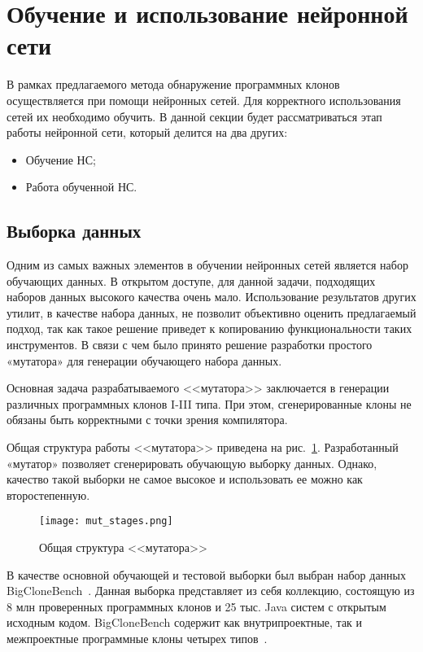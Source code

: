 \section{Обучение и использование нейронной сети}

В рамках предлагаемого метода обнаружение программных клонов осуществляется при помощи нейронных сетей. Для корректного использования сетей их необходимо обучить. В данной секции будет рассматриваться этап работы нейронной сети, который делится на два других:

\begin{itemize}
\setlength\itemsep{0mm}
\item Обучение НС;
\item Работа обученной НС.
\end{itemize}

\subsection{Выборка данных}

Одним из самых важных элементов в обучении нейронных сетей является набор обучающих данных. В открытом доступе, для данной задачи, подходящих наборов данных высокого качества очень мало. Использование результатов других утилит, в качестве набора данных, не позволит объективно оценить предлагаемый подход, так как такое решение приведет к копированию функциональности таких инструментов. В связи с чем было принято решение разработки простого «мутатора» для генерации обучающего набора данных.

Основная задача разрабатываемого <<мутатора>> заключается в генерации различных программных клонов I-III типа. При этом, сгенерированные клоны не обязаны быть корректными с точки зрения компилятора.

Общая структура работы <<мутатора>> приведена на рис.~\ref{fig:mut_stages}. Разработанный «мутатор» позволяет сгенерировать обучающую выборку данных. Однако, качество такой выборки не самое высокое и использовать ее можно как второстепенную.

\begin{figure}[htbp]
\centering
\texttt{[image: mut\_stages.png]}
\caption{Общая структура <<мутатора>>}
\label{fig:mut_stages}
\end{figure}

В качестве основной обучающей и тестовой выборки был выбран набор данных BigCloneBench~\cite{bcb}. Данная выборка представляет из себя коллекцию, состоящую из 8 млн проверенных программных клонов и 25 тыс. Java систем с открытым исходным кодом. BigCloneBench содержит как внутрипроектные, так и межпроектные программные клоны четырех типов~\cite{bcb}.

